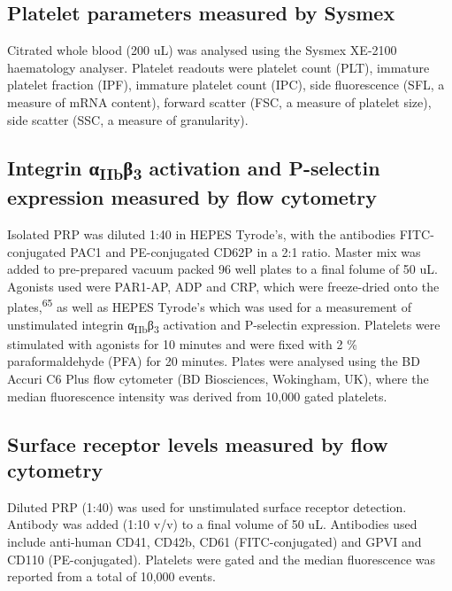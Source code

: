 \documentclass[11pt,twoside]{bristolthesis}
\begin{document}
\hypertarget{platelet-parameters-measured-by-sysmex}{%
\subsection{Platelet parameters measured by Sysmex}\label{platelet-parameters-measured-by-sysmex}}

Citrated whole blood (200 uL) was analysed using the Sysmex XE-2100 haematology analyser. Platelet readouts were platelet count (PLT), immature platelet fraction (IPF), immature platelet count (IPC), side fluorescence (SFL, a measure of mRNA content), forward scatter (FSC, a measure of platelet size), side scatter (SSC, a measure of granularity).

\hypertarget{integrin-ux3b1iibux3b23-activation-and-p-selectin-expression-measured-by-flow-cytometry}{%
\subsection{\texorpdfstring{Integrin α\textsubscript{IIb}β\textsubscript{3} activation and P-selectin expression measured by flow cytometry}{Integrin αIIbβ3 activation and P-selectin expression measured by flow cytometry}}\label{integrin-ux3b1iibux3b23-activation-and-p-selectin-expression-measured-by-flow-cytometry}}

Isolated PRP was diluted 1:40 in HEPES Tyrode's, with the antibodies FITC-conjugated PAC1 and PE-conjugated CD62P in a 2:1 ratio. Master mix was added to pre-prepared vacuum packed 96 well plates to a final folume of 50 uL. Agonists used were PAR1-AP, ADP and CRP, which were freeze-dried onto the plates,\textsuperscript{65} as well as HEPES Tyrode's which was used for a measurement of unstimulated integrin α\textsubscript{IIb}β\textsubscript{3} activation and P-selectin expression. Platelets were stimulated with agonists for 10 minutes and were fixed with 2 \% paraformaldehyde (PFA) for 20 minutes. Plates were analysed using the BD Accuri C6 Plus flow cytometer (BD Biosciences, Wokingham, UK), where the median fluorescence intensity was derived from 10,000 gated platelets.

\hypertarget{surface-receptor-levels-measured-by-flow-cytometry}{%
\subsection{Surface receptor levels measured by flow cytometry}\label{surface-receptor-levels-measured-by-flow-cytometry}}

Diluted PRP (1:40) was used for unstimulated surface receptor detection. Antibody was added (1:10 v/v) to a final volume of 50 uL. Antibodies used include anti-human CD41, CD42b, CD61 (FITC-conjugated) and GPVI and CD110 (PE-conjugated). Platelets were gated and the median fluorescence was reported from a total of 10,000 events.
\end{document}

